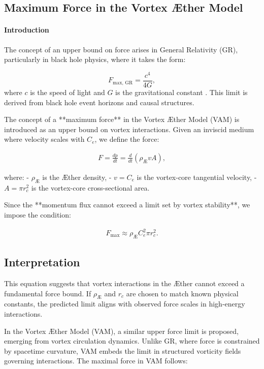 

\subsection{Maximum Force in the Vortex \AE ther Model}


\paragraph*{Introduction}
The concept of an upper bound on force arises in General Relativity (GR), particularly in black hole physics, where it takes the form:


\begin{equation*}
    F_{\text{max, GR}} = \frac{c^4}{4G},
\end{equation*}
where $c$ is the speed of light and $G$ is the gravitational constant \cite{Schiller2006}. This limit is derived from black hole event horizons and causal structures.


The concept of a **maximum force** in the Vortex Æther Model (VAM) is introduced as an upper bound on vortex interactions. Given an inviscid medium where velocity scales with \( C_e \), we define the force:

\begin{align}
    F = \frac{dp}{dt} = \frac{d}{dt} (\rho_{\!Æ} v A),
\end{align}

where:
- \( \rho_{\!Æ} \) is the Æther density,
- \( v = C_e \) is the vortex-core tangential velocity,
- \( A = \pi r_c^2 \) is the vortex-core cross-sectional area.

Since the **momentum flux cannot exceed a limit set by vortex stability**, we impose the condition:

\begin{align}
    F_{\max} \approx \rho_{\!Æ} C_e^2 \pi r_c^2.
\end{align}

\subsection{Interpretation}

This equation suggests that vortex interactions in the Æther cannot exceed a fundamental force bound. If \( \rho_{\!Æ} \) and \( r_c \) are chosen to match known physical constants, the predicted limit aligns with observed force scales in high-energy interactions.

In the Vortex \AE ther Model (VAM), a similar upper force limit is proposed, emerging from vortex circulation dynamics. Unlike GR, where force is constrained by spacetime curvature, VAM embeds the limit in structured vorticity fields governing interactions. The maximal force in VAM follows:



